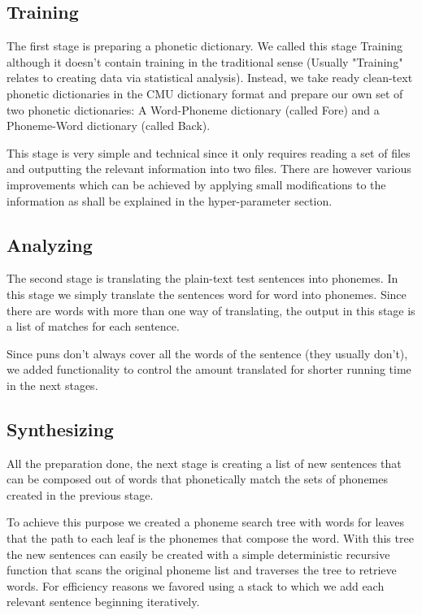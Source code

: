 \documentclass[11pt,a4paper]{article}
\begin{document}
\subsection{Training}

The first stage is preparing a phonetic dictionary. We called this stage Training although it doesn't contain training in the traditional sense (Usually "Training" relates to creating data via statistical analysis). Instead, we take ready clean-text phonetic dictionaries in the CMU dictionary format and prepare our own set of two phonetic dictionaries: A Word-Phoneme dictionary (called Fore) and a Phoneme-Word dictionary (called Back).

This stage is very simple and technical since it only requires reading a set of files and outputting the relevant information into two files. There are however various improvements which can be achieved by applying small modifications to the information as shall be explained in the hyper-parameter section.

\subsection{Analyzing}

The second stage is translating the plain-text test sentences into phonemes. In this stage we simply translate the sentences word for word into phonemes. Since there are words with more than one way of translating, the output in this stage is a list of matches for each sentence.

Since puns don't always cover all the words of the sentence (they usually don't), we added functionality to control the amount translated for shorter running time in the next stages. 

\subsection{Synthesizing}

All the preparation done, the next stage is creating a list of new sentences that can be composed out of words that phonetically match the sets of phonemes created in the previous stage. 

To achieve this purpose we created a phoneme search tree with words for leaves that the path to each leaf is the phonemes that compose the word. With this tree the new sentences can easily be created with a simple deterministic recursive function that scans the original phoneme list and traverses the tree to retrieve words. For efficiency reasons we favored using a stack to which we add each relevant sentence beginning iteratively.
\end{document}
